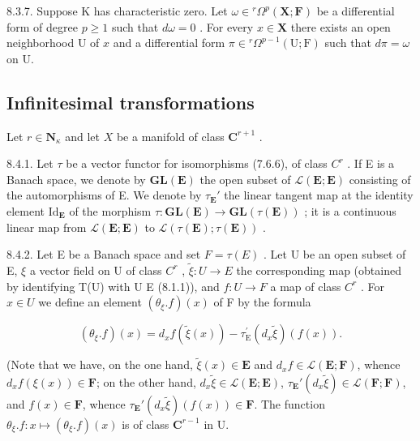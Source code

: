 8.3.7. Suppose K has characteristic zero. Let \(\omega \in {}^r\Omega^p (\mathbf{X};\mathbf{F})\) be a differential form of degree \(p\geqslant 1\) such that \(d\omega = 0\) . For every \(x\in \mathbf{X}\) there exists an open neighborhood U of \(x\) and a differential form \(\pi \in {}^r\Omega^{p - 1}(\mathrm{U};\mathrm{F})\) such that \(d\pi = \omega\) on U.

\subsection{Infinitesimal transformations}

Let \(r \in \mathbf{N}_{\kappa}\) and let \(X\) be a manifold of class \(\mathbf{C}^{r+1}\) .

8.4.1. Let \(\tau\) be a vector functor for isomorphisms (7.6.6), of class \(C^r\) . If E is a Banach space, we denote by \(\mathbf{GL}(\mathbf{E})\) the open subset of \(\mathcal{L}(\mathbf{E};\mathbf{E})\) consisting of the automorphisms of E. We denote by \(\tau_{\mathbf{E}}'\) the linear tangent map at the identity element \(\mathrm{Id}_{\mathbf{E}}\) of the morphism \(\tau\colon\mathbf{GL}(\mathbf{E})\to\mathbf{GL}(\tau(\mathbf{E}))\) ; it is a continuous linear map from \(\mathcal{L}(\mathbf{E};\mathbf{E})\) to \(\mathcal{L}(\tau(\mathbf{E});\tau(\mathbf{E}))\) .

8.4.2. Let E be a Banach space and set \(F = \tau(E)\) . Let U be an open subset of E, \(\xi\) a vector field on U of class \(C^r\) , \(\tilde{\xi} \colon U \to E\) the corresponding map (obtained by identifying T(U) with U \times E (8.1.1)), and \(f \colon U \to F\) a map of class \(C^r\) . For \(x \in U\) we define an element \((\theta_\xi.f)(x)\) of F by the formula

\[
(\theta_ {\xi}. f) (x) = d _ {x} f (\tilde {\xi} (x)) - \tau_ {\mathrm{E}} ^ {\prime} (d _ {x} \tilde {\xi}) (f (x)).\tag{1}
\]

(Note that we have, on the one hand, \(\tilde{\xi}(x) \in \mathbf{E}\) and \(d_x f \in \mathcal{L}(\mathbf{E}; \mathbf{F})\), whence \(d_x f(\xi(x)) \in \mathbf{F}\); on the other hand, \(d_x \tilde{\xi} \in \mathcal{L}(\mathbf{E}; \mathbf{E})\), \(\tau_{\mathbf{E}}'(d_x \tilde{\xi}) \in \mathcal{L}(\mathbf{F}; \mathbf{F})\), and \(f(x) \in \mathbf{F}\), whence \(\tau_{\mathbf{E}}'(d_x \tilde{\xi})(f(x)) \in \mathbf{F}\). The function \(\theta_{\xi}.f: x \mapsto (\theta_{\xi}.f)(x)\) is of class \(\mathbf{C}^{r-1}\) in U.

